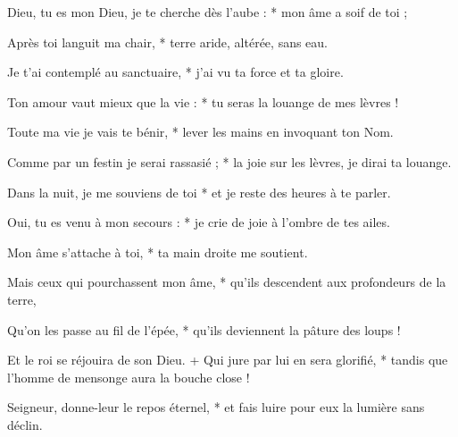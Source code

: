 \item Dieu, tu es mon Dieu, je te cherche dès l'aube : * mon âme a soif de toi ;

\item Après toi languit ma chair, * terre aride, altérée, sans eau.

\item Je t'ai contemplé au sanctuaire, * j'ai vu ta force et ta gloire.

\item Ton amour vaut mieux que la vie : * tu seras la louange de mes lèvres !

\item Toute ma vie je vais te bénir, * lever les mains en invoquant ton Nom.

\item Comme par un festin je serai rassasié ; * la joie sur les lèvres, je dirai ta louange.

\item Dans la nuit, je me souviens de toi * et je reste des heures à te parler.

\item Oui, tu es venu à mon secours : * je crie de joie à l'ombre de tes ailes.

\item Mon âme s'attache à toi, * ta main droite me soutient.

\item Mais ceux qui pourchassent mon âme, * qu'ils descendent aux profondeurs de la terre,

\item Qu'on les passe au fil de l'épée, * qu'ils deviennent la pâture des loups !

\item Et le roi se réjouira de son Dieu. + Qui jure par lui en sera glorifié, * tandis que l'homme de mensonge aura la bouche close !

\item Seigneur, donne-leur le repos éternel, * et fais luire pour eux la lumière sans déclin.